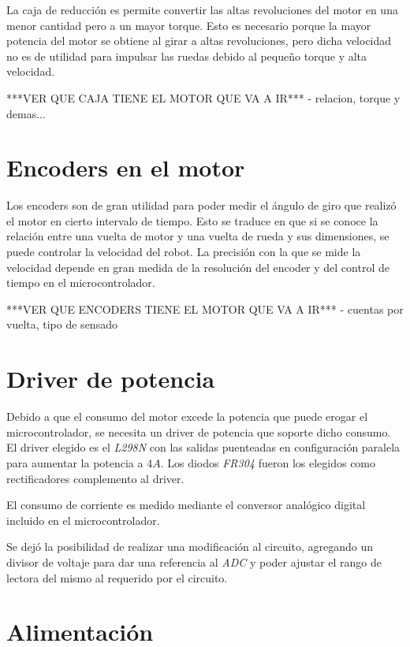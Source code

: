 \documentclass[a4paper,10pt]{article}
\begin{document}
La caja de reducci\'on es permite convertir las altas revoluciones del motor en una menor cantidad pero a un mayor torque.
Esto es necesario porque la mayor potencia del motor se obtiene al girar a altas revoluciones, pero dicha velocidad no es de utilidad
para impulsar las ruedas debido al peque\~no torque y alta velocidad.

***VER QUE CAJA TIENE EL MOTOR QUE VA A IR*** - relacion, torque y demas...

\section{Encoders en el motor}
\label{encoders}

Los encoders son de gran utilidad para poder medir el \'angulo de giro que realiz\'o el motor en cierto intervalo de tiempo.
Esto se traduce en que si se conoce la relaci\'on entre una vuelta de motor y una vuelta de rueda y sus dimensiones,
se puede controlar la velocidad del robot. La precisi\'on con la que se mide la velocidad depende en gran medida de la resoluci\'on
del encoder y del control de tiempo en el microcontrolador.

***VER QUE ENCODERS TIENE EL MOTOR QUE VA A IR*** - cuentas por vuelta, tipo de sensado

\section{Driver de potencia}
\label{driver}

Debido a que el consumo del motor excede la potencia que puede erogar el microcontrolador, se necesita un driver de potencia que soporte dicho consumo.
El driver elegido es el \emph{L298N} con las salidas puenteadas en configuraci\'on paralela para aumentar la potencia a $4A$. Los diodos \emph{FR304}
fueron los elegidos como rectificadores complemento al driver.

El consumo de corriente es medido mediante el conversor anal\'ogico digital incluido en el microcontrolador.

Se dej\'o la posibilidad de realizar una modificaci\'on al circuito, agregando un divisor de voltaje para dar una referencia al \emph{ADC} y poder ajustar
el rango de lectora del mismo al requerido por el circuito.

\section{Alimentaci\'on}
\label{alimentacion}
\end{document}
